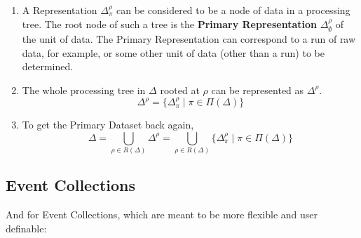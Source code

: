 \documentclass{cmspaper}
\begin{document}
\begin{enumerate}
\item A Representation $\Delta_{\pi}^{\rho}$ can 
be considered to be a node of data in a processing tree.  
The root node of such a tree is the {\bf Primary Representation} $\Delta_{\emptyset}^{\rho}$ 
of the unit of data.  The Primary Representation can correspond to a 
run of raw data, for example, or some other unit of data 
(other than a run) to be determined.  

\item The whole processing tree in $\Delta$ rooted 
at $\rho$ can be represented as $\Delta^{\rho}$. 
\begin{equation}
\Delta^{\rho} = \{ \Delta_{\pi}^{\rho} \mid \pi \in \Pi(\Delta) \}
\end{equation}

\item To get the Primary Dataset back again, 
\begin{equation}
\Delta = \bigcup_{\rho \in R(\Delta)} \Delta^{\rho} = \bigcup_{\rho \in R(\Delta)} \{ \Delta_{\pi}^{\rho} \mid \pi \in \Pi(\Delta) \} 
\end{equation}

\end{enumerate}


\subsection{Event Collections}

And for Event Collections, which are meant to be more flexible and user definable: 
\end{document}
